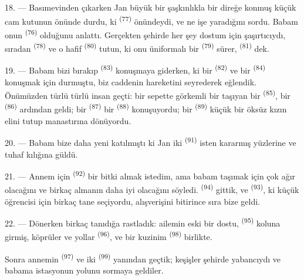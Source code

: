 \VUsaut{3.0mm}

18. --- Basımevinden çıkarken Jan büyük bir şaşkınlıkla bir direğe konmuş küçük
cam kutunun önünde durdu, ki  \textsuperscript{(77)}
önündeydi, ve ne işe yaradığını sordu. Babam onun 
\textsuperscript{(76)} olduğunu anlattı. Gerçekten şehirde her şey dostum için
şaşırtıcıydı, sıradan  \textsuperscript{(78)} ve
o hafif  \textsuperscript{(80)} tutun, ki
onu üniformalı bir  \textsuperscript{(79)} sürer,  \textsuperscript{(81)} dek.

19. --- Babam bizi bırakıp  \textsuperscript{(83)}
konuşmaya giderken, ki bir  \textsuperscript{(82)} ve bir
 \textsuperscript{(84)} konuşmak için durmuştu, biz caddenin
hareketini seyrederek eğlendik. Önümüzden türlü türlü insan geçti: bir
sepette görkemli bir  taşıyan bir 
\textsuperscript{(85)}, bir  \textsuperscript{(86)}
ardından geldi; bir  \textsuperscript{(87)} bir  \textsuperscript{(88)} konuşuyordu; bir 
\textsuperscript{(89)} küçük bir öksüz kızın elini tutup manastırına
dönüyordu.

\VUsaut{3.0mm}

20. --- Babam bize daha yeni katılmıştı ki Jan iki 
\textsuperscript{(91)} isten kararmış yüzlerine ve tuhaf kılığına güldü.

21. --- Annem için  \textsuperscript{(92)} bir bitki
almak istedim, ama babam taşımak için çok ağır olacağını ve birkaç
 almanın daha iyi olacağını söyledi.  \textsuperscript{(94)} gittik, ve 
\textsuperscript{(93)}, ki küçük öğrencisi için birkaç tane seçiyordu,
alışverişini bitirince sıra bize geldi.

22. --- Dönerken birkaç tanıdığa rastladık: ailemin eski bir dostu,
 \textsuperscript{(95)} koluna girmiş, köprüler ve yollar
 \textsuperscript{(96)}, ve bir kuzinim 
\textsuperscript{(98)} birlikte.

Sonra annemin  \textsuperscript{(97)} ve iki
 \textsuperscript{(99)} yanından geçtik; keşişler şehirde
yabancıydı ve babama istasyonun yolunu sormaya geldiler.
\VUsaut{6.0mm}
\VUfilet{22mm}
